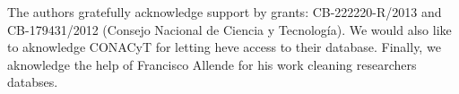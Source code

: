 \begin{acknowledgements}
The authors gratefully acknowledge support by grants:
  CB-222220-R/2013 and CB-179431/2012 (Consejo Nacional de Ciencia y
  Tecnolog\'ia). We would also like to aknowledge CONACyT for letting
  heve access to their database. Finally, we aknowledge the help of Francisco
  Allende for his work cleaning researchers databses.

\end{acknowledgements}


